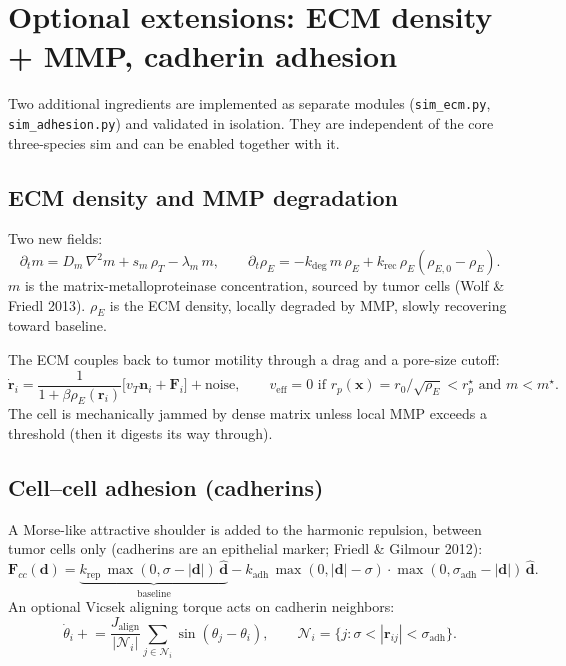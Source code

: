 \documentclass[11pt,letterpaper]{article}
\begin{document}
\section{Optional extensions: ECM density + MMP, cadherin adhesion}
\label{sec:m1-extensions}

Two additional ingredients are implemented as separate modules
(\texttt{sim\_ecm.py}, \texttt{sim\_adhesion.py}) and validated in
isolation. They are independent of the core three-species sim and can
be enabled together with it.

\subsection{ECM density and MMP degradation}

Two new fields:
\begin{equation}
\partial_t m = D_m\,\nabla^2 m + s_m\,\rho_T - \lambda_m\,m,
\qquad
\partial_t \rho_E = -k_{\text{deg}}\,m\,\rho_E + k_{\text{rec}}\,\rho_E(\rho_{E,0}-\rho_E).
\end{equation}
$m$ is the matrix-metalloproteinase concentration, sourced by tumor
cells (Wolf \& Friedl 2013). $\rho_E$ is the ECM density, locally
degraded by MMP, slowly recovering toward baseline.

The ECM couples back to tumor motility through a drag and a pore-size
cutoff:
\begin{equation}
\dot{\mathbf{r}}_i = \frac{1}{1 + \beta\rho_E(\mathbf{r}_i)}\big[v_T\mathbf{n}_i + \mathbf{F}_i\big] + \text{noise},
\qquad
v_{\text{eff}} = 0 \text{ if } r_p(\mathbf{x}) = r_0/\sqrt{\rho_E} < r_p^\star \text{ and } m < m^\star.
\end{equation}
The cell is mechanically jammed by dense matrix unless local MMP
exceeds a threshold (then it digests its way through).

\subsection{Cell--cell adhesion (cadherins)}

A Morse-like attractive shoulder is added to the harmonic repulsion,
between tumor cells only (cadherins are an epithelial marker; Friedl \&
Gilmour 2012):
\begin{equation}
\mathbf{F}_{cc}(\mathbf{d}) = \underbrace{k_{\text{rep}}\,\max(0,\sigma-|\mathbf{d}|)\,\hat{\mathbf{d}}}_{\text{baseline}}
   - k_{\text{adh}}\,\max(0,|\mathbf{d}|-\sigma)\cdot\max(0,\sigma_{\text{adh}}-|\mathbf{d}|)\,\hat{\mathbf{d}}.
\end{equation}
An optional Vicsek aligning torque acts on cadherin neighbors:
\begin{equation}
\dot{\theta}_i \mathrel{+}\!= \frac{J_{\text{align}}}{|\mathcal{N}_i|}\sum_{j\in\mathcal{N}_i} \sin(\theta_j-\theta_i),
\qquad \mathcal{N}_i = \{j: \sigma < |\mathbf{r}_{ij}| < \sigma_{\text{adh}}\}.
\end{equation}
\end{document}
